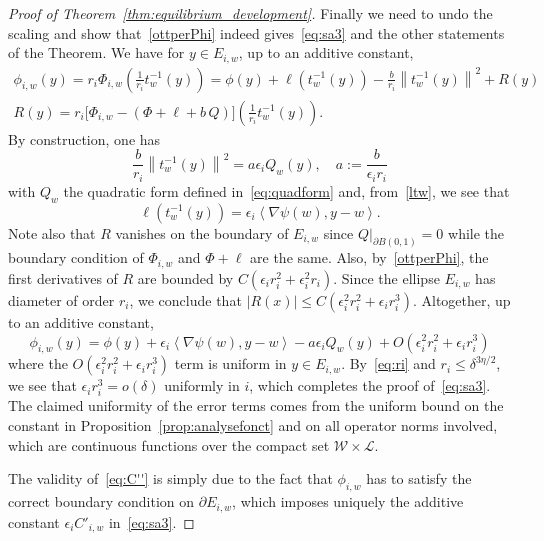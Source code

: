 \documentclass[10pt]{amsart}
\theoremstyle{definition}\newtheorem{defi}[theo]{Definition}\newtheorem{rema}[theo]{Remark}\newtheorem{exam}[theo]{Example}\newtheorem{exem}[theo]{Example}\newtheorem{nota}[theo]{Notation}
\newcommand{\clL}{\mathcal{L}}
\newcommand{\clW}{\mathcal{W}}
\newcommand{\eps}{\epsilon}
\begin{document}
\begin{proof}[Proof of Theorem~\ref{thm:equilibrium_development}]
Finally we need to undo the scaling and show that~\eqref{ottperPhi} indeed gives~\eqref{eq:sa3} and the other statements of the Theorem. We have for $y\in E_{i,w}$, up to an additive constant,
\begin{multline}
\phi_{i,w}(y)=r_i\Phi_{i,w}\left(\frac1{r_i}t_w^{-1}(y)\right)=\phi(y)+\ell\left(t_w^{-1}(y)\right)-\frac b{r_i} \left\|t_w^{-1} (y)\right\|^2+R(y)\\
R(y)={r_i}\Big[\Phi_{i,w}-(\Phi+\ell+b\, Q)\Big]\left(\frac1{r_i}t^{-1}_w(y)\right).
\end{multline}
By construction, one has
\begin{equation}
\frac b{r_i} \left\|t_w^{-1} (y)\right\|^2=a\epsilon_i Q_w(y),\quad a:=\frac b{\epsilon_i r_i}
\end{equation}
with $Q_w$ the quadratic form defined in~\eqref{eq:quadform} and, from~\eqref{ltw}, we see that
\begin{equation}
\ell\left(t_w^{-1}(y)\right)=\epsilon_i \left\langle\nabla\psi(w),y-w\right\rangle.
\end{equation}
Note also that $R$ vanishes on the boundary of $E_{i,w}$ since $Q|_{\partial B(0,1)}=0$ while the boundary condition of $\Phi_{i,w}$ and $\Phi+\ell$ are the same. Also, by~\eqref{ottperPhi}, the first derivatives of $R$ are bounded by $C(\epsilon_i r_i^2+\epsilon_i^2 r_i)$. Since the ellipse $E_{i,w}$ has diameter of order $r_i$, we conclude that $|R(x)|\le C (\eps_i^2 r_i^2+ \eps_i r_i^3)$. Altogether, up to an additive constant,
\begin{equation}
\phi_{i,w} (y)= \phi(y)+\epsilon_i \left\langle \nabla\psi(w), y-w\right\rangle -a\epsilon_i Q_w (y)+ O\left(\eps_i^2 r_i^2+ \eps_i r_i^3\right)
\end{equation}
where the $O(\eps_i^2 r_i^2+ \eps_i r_i^3) $ term is uniform in $y\in E_{i,w}$. By~\eqref{eq:ri} and $r_i\le \delta^{3
\eta/2}$, we see that $\epsilon_i r_i^3=o(\delta)$ uniformly in $i$, which completes the proof of~\eqref{eq:sa3}. The claimed uniformity of the error terms comes from the uniform bound on the constant in Proposition~\ref{prop:analysefonct} and on all operator norms involved, which are continuous functions over the compact set $\clW \times \clL$.



The validity of~\eqref{eq:C''} is simply due to the fact that $\phi_{i,w}$ has to satisfy the correct boundary condition on $\partial E_{i,w}$, which imposes uniquely the additive constant $\epsilon_i C'_{i,w}$ in~\eqref{eq:sa3}.



\end{proof}
\end{document}
